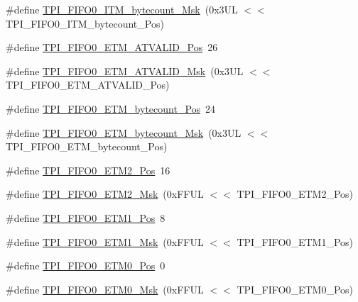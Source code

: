 \begin{DoxyCompactItemize}
\#define \hyperlink{group___c_m_s_i_s___t_p_i_ga07bafa971b8daf0d63b3f92b9ae7fa16}{T\+P\+I\+\_\+\+F\+I\+F\+O0\+\_\+\+I\+T\+M\+\_\+bytecount\+\_\+\+Msk}~(0x3\+U\+L $<$$<$ T\+P\+I\+\_\+\+F\+I\+F\+O0\+\_\+\+I\+T\+M\+\_\+bytecount\+\_\+\+Pos)
\item 
\#define \hyperlink{group___c_m_s_i_s___t_p_i_ga7fdeb3e465ca4aa9e3b2f424ab3bbd1d}{T\+P\+I\+\_\+\+F\+I\+F\+O0\+\_\+\+E\+T\+M\+\_\+\+A\+T\+V\+A\+L\+I\+D\+\_\+\+Pos}~26
\item 
\#define \hyperlink{group___c_m_s_i_s___t_p_i_ga4f0005dc420b28f2369179a935b9a9d3}{T\+P\+I\+\_\+\+F\+I\+F\+O0\+\_\+\+E\+T\+M\+\_\+\+A\+T\+V\+A\+L\+I\+D\+\_\+\+Msk}~(0x3\+U\+L $<$$<$ T\+P\+I\+\_\+\+F\+I\+F\+O0\+\_\+\+E\+T\+M\+\_\+\+A\+T\+V\+A\+L\+I\+D\+\_\+\+Pos)
\item 
\#define \hyperlink{group___c_m_s_i_s___t_p_i_ga2f738e45386ebf58c4d406f578e7ddaf}{T\+P\+I\+\_\+\+F\+I\+F\+O0\+\_\+\+E\+T\+M\+\_\+bytecount\+\_\+\+Pos}~24
\item 
\#define \hyperlink{group___c_m_s_i_s___t_p_i_gad2536b3a935361c68453cd068640af92}{T\+P\+I\+\_\+\+F\+I\+F\+O0\+\_\+\+E\+T\+M\+\_\+bytecount\+\_\+\+Msk}~(0x3\+U\+L $<$$<$ T\+P\+I\+\_\+\+F\+I\+F\+O0\+\_\+\+E\+T\+M\+\_\+bytecount\+\_\+\+Pos)
\item 
\#define \hyperlink{group___c_m_s_i_s___t_p_i_ga5f0037cc80c65e86d9e94e5005077a48}{T\+P\+I\+\_\+\+F\+I\+F\+O0\+\_\+\+E\+T\+M2\+\_\+\+Pos}~16
\item 
\#define \hyperlink{group___c_m_s_i_s___t_p_i_gaa82a7b9b99c990fb12eafb3c84b68254}{T\+P\+I\+\_\+\+F\+I\+F\+O0\+\_\+\+E\+T\+M2\+\_\+\+Msk}~(0x\+F\+F\+U\+L $<$$<$ T\+P\+I\+\_\+\+F\+I\+F\+O0\+\_\+\+E\+T\+M2\+\_\+\+Pos)
\item 
\#define \hyperlink{group___c_m_s_i_s___t_p_i_gac5a2ef4b7f811d1f3d81ec919d794413}{T\+P\+I\+\_\+\+F\+I\+F\+O0\+\_\+\+E\+T\+M1\+\_\+\+Pos}~8
\item 
\#define \hyperlink{group___c_m_s_i_s___t_p_i_gaad9c1a6ed34a70905005a0cc14d5f01b}{T\+P\+I\+\_\+\+F\+I\+F\+O0\+\_\+\+E\+T\+M1\+\_\+\+Msk}~(0x\+F\+F\+U\+L $<$$<$ T\+P\+I\+\_\+\+F\+I\+F\+O0\+\_\+\+E\+T\+M1\+\_\+\+Pos)
\item 
\#define \hyperlink{group___c_m_s_i_s___t_p_i_ga48783ce3c695d8c06b1352a526110a87}{T\+P\+I\+\_\+\+F\+I\+F\+O0\+\_\+\+E\+T\+M0\+\_\+\+Pos}~0
\item 
\#define \hyperlink{group___c_m_s_i_s___t_p_i_gaf924f7d1662f3f6c1da12052390cb118}{T\+P\+I\+\_\+\+F\+I\+F\+O0\+\_\+\+E\+T\+M0\+\_\+\+Msk}~(0x\+F\+F\+U\+L $<$$<$ T\+P\+I\+\_\+\+F\+I\+F\+O0\+\_\+\+E\+T\+M0\+\_\+\+Pos)
\item 

\end{DoxyCompactItemize}
